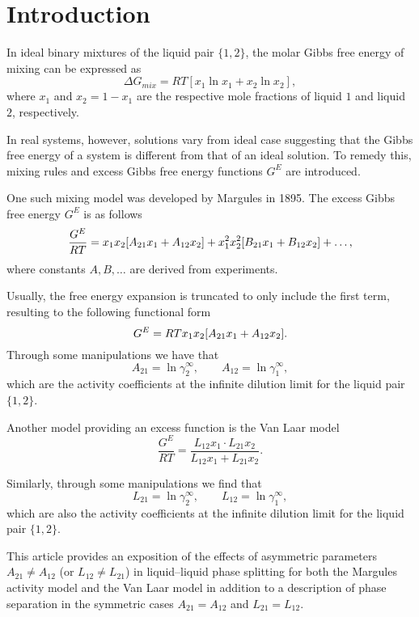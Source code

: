 \section{Introduction}


In ideal binary mixtures of the liquid pair $\{1,2\}$, the molar Gibbs free energy of 
mixing can be expressed as
\[
    \Delta G_{mix} = RT[x_1\ln x_1 + x_2\ln x_2],
\]
where $x_1$ and $x_2 = 1 - x_1$ are the respective mole fractions of liquid $1$ and
liquid $2$, respectively.

In real systems, however, solutions vary from ideal case suggesting that the
Gibbs free energy of a system is different from that of an ideal solution.
To remedy this, mixing rules and excess Gibbs free energy functions $G^E$ are
introduced.

One such mixing model was developed by Margules in 1895. %
The excess Gibbs free energy $G^E$ is as follows
\begin{equation}
    \dfrac{G^E}{RT} = x_1x_2 \qty[A_{21}x_1 + A_{12}x_2] + x_1^2x_2^2
    \qty[B_{21}x_1 + B_{12}x_2] + \ldots,
\end{equation}
where constants $A, B, \ldots$ are derived from experiments. %

Usually, the free energy expansion is truncated to only include the first term,
resulting to the following functional form
\begin{equation}
    G^E = RTx_1x_2 \qty[A_{21} x_1 + A_{12}x_2].
\end{equation}
Through some manipulations we have that
\begin{equation}\label{eq:inf-dil}
    A_{21} = \ln \gamma_2^\infty,\qquad
    A_{12} = \ln \gamma_1^\infty,
\end{equation}
which are the activity coefficients at the infinite dilution limit for the
liquid pair $\{1,2\}$.

Another model providing an excess function is the Van Laar model
\begin{equation}\label{eq:vanlaar}
    \dfrac{G^E}{RT} = \dfrac{L_{12}x_1 \cdot L_{21} x_2}{L_{12}x_1 + L_{21}x_2}.
\end{equation}

Similarly, through some manipulations we find that
\begin{equation}\label{eq:inf-dil-vanlaar}
    L_{21} = \ln \gamma_2^\infty,\qquad
    L_{12} = \ln \gamma_1^\infty,
\end{equation}
which are also the activity coefficients at the infinite dilution limit for
the liquid pair $\{1, 2\}$.

This article provides an exposition of the effects of asymmetric parameters
$A_{21} \neq A_{12}$ (or $L_{12} \neq L_{21}$) in liquid--liquid 
phase splitting for both the Margules activity model and the Van Laar model
in addition to a description of phase separation in the symmetric cases
$A_{21} = A_{12}$ and $L_{21} = L_{12}$.

